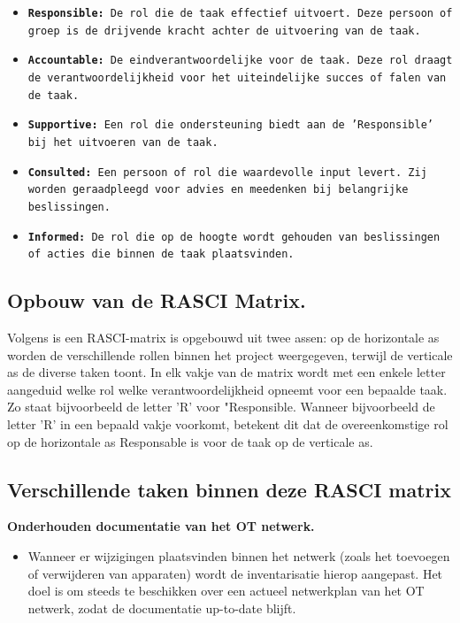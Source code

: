 \begin{itemize}
    \item \texttt{\textbf{Responsible:} De rol die de taak effectief uitvoert. Deze persoon of groep is de drijvende kracht achter de uitvoering van de taak. }
    \item \texttt{\textbf{Accountable:} De eindverantwoordelijke voor de taak. Deze rol draagt de verantwoordelijkheid voor het uiteindelijke succes of falen van de taak. }
    \item \texttt{\textbf{Supportive:} Een rol die ondersteuning biedt aan de 'Responsible' bij het uitvoeren van de taak. }
    \item \texttt{\textbf{Consulted:} Een persoon of rol die waardevolle input levert. Zij worden geraadpleegd voor advies en meedenken bij belangrijke beslissingen.}
    \item \texttt{\textbf{Informed:} De rol die op de hoogte wordt gehouden van beslissingen of acties die binnen de taak plaatsvinden.}
\end{itemize}

\subsection{Opbouw van de RASCI Matrix.}
Volgens \textcite{Cabanillas2011} is een RASCI-matrix is opgebouwd uit twee assen: op de horizontale as worden de verschillende rollen binnen het project weergegeven, terwijl de verticale as de diverse taken toont. In elk vakje van de matrix wordt met een enkele letter aangeduid welke rol welke verantwoordelijkheid opneemt voor een bepaalde taak. Zo staat bijvoorbeeld de letter 'R' voor "Responsible. Wanneer bijvoorbeeld de letter 'R' in een bepaald vakje voorkomt, betekent dit dat de overeenkomstige rol op de horizontale as Responsable is voor de taak op de verticale as. \autocite{Cabanillas2011}

\subsection{Verschillende taken binnen deze RASCI matrix}

\textbf{Onderhouden documentatie van het OT netwerk.}
\begin{itemize}[label=\textbullet]
    \item Wanneer er wijzigingen plaatsvinden binnen het netwerk (zoals het toevoegen of verwijderen van apparaten) wordt de inventarisatie hierop aangepast. Het doel is om steeds te beschikken over een actueel netwerkplan van het OT netwerk, zodat de documentatie up-to-date blijft. 
\end{itemize}

